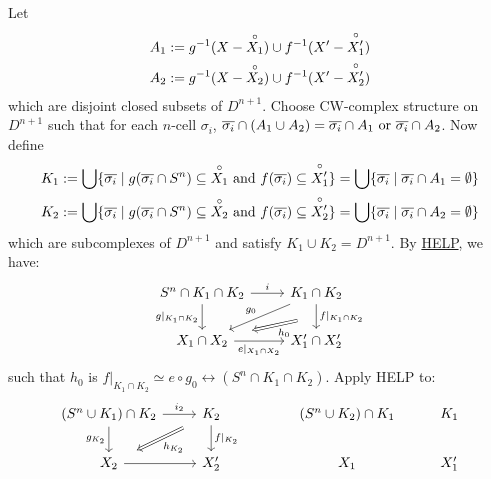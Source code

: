 \begin{prf}
        Let
        \begin{align*}
            A_1:= g^{-1}(X-\overset{\circ}{X_1}) & \cup f^{-1}(X' - \overset{\circ}{X'_1})\\
            A_2:= g^{-1}(X-\overset{\circ}{X_2}) & \cup f^{-1}(X' - \overset{\circ}{X'_2})
        \end{align*}
        which are disjoint closed subsets of $D^{n+1}$.
        Choose CW-complex structure on $D^{n+1}$ 
        such that for each $n$-cell $\sigma_i$,
        $\overline{\sigma_i} \cap (A_1 \cup A_2) = \overline{\sigma_i} \cap A_1 \text{ or } \overline{\sigma_i} \cap A_2$.
        Now define
        \begin{align*}
            K_1:= \bigcup \{ \overline{\sigma_i} \mid g(\overline{\sigma_i} \cap S^n) \subseteq \overset{\circ}{X_1} \text{ and } f(\overline{\sigma_i}) \subseteq \overset{\circ}{X'_1} \} & = \bigcup \{ \overline{\sigma_i} \mid \overline{\sigma_i} \cap A_1 = \emptyset \}\\
            K_2:= \bigcup \{ \overline{\sigma_i} \mid g(\overline{\sigma_i} \cap S^n) \subseteq \overset{\circ}{X_2} \text{ and } f(\overline{\sigma_i}) \subseteq \overset{\circ}{X'_2} \} & = \bigcup \{ \overline{\sigma_i} \mid \overline{\sigma_i} \cap A_2 = \emptyset \}
        \end{align*}
        which are subcomplexes of $D^{n+1}$ and satisfy $K_1 \cup K_2 = D^{n+1}$.
        By \hyperref[hyp:HELP]{HELP}, we have:
        \[\begin{tikzcd}
            {S^n \cap K_1 \cap K_2} & {K_1 \cap K_2} \\
            {X_1 \cap X_2} & {X'_1 \cap X'_2}
            \arrow["i", from=1-1, to=1-2]
            \arrow["{g|_{K_1 \cap K_2}}"', from=1-1, to=2-1]
            \arrow[""{name=0, anchor=center, inner sep=0}, "{f|_{K_1\cap K_2}}", from=1-2, to=2-2]
            \arrow["{e|_{X_1 \cap X_2}}"', from=2-1, to=2-2]
            \arrow["{g_0}"', from=1-2, to=2-1]
            \arrow["{h_0}", shorten <=13pt, shorten >=13pt, Rightarrow, from=0, to=2-1]
        \end{tikzcd}\]
        such that $h_0$ is $f|_{K_1 \cap K_2} \simeq e \circ g_0 \rel (S^n \cap K_1 \cap K_2)$.
        Apply HELP to:
        \[\begin{tikzcd}
            {(S^n \cup K_1) \cap K_2} & {K_2} && {(S^n \cup K_2) \cap K_1} & {K_1} \\
            {X_2} & {X'_2} && {X_1} & {X'_1}
            \arrow["i_2", from=1-1, to=1-2]
            \arrow["{f|_{K_2}}", from=1-2, to=2-2]
            \arrow[from=2-1, to=2-2]
            \arrow["{g_{K_2}}"', from=1-1, to=2-1]
            \arrow["{h_{K_2}}", shorten <=10pt, shorten >=10pt, Rightarrow, from=1-2, to=2-1]

\end{tikzcd}\]
\end{prf}
